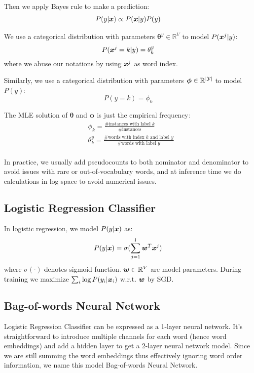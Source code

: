 \documentclass[11pt]{article}
\begin{document}
Then we apply Bayes rule to make a prediction:
\begin{equation*}
    P(y | \boldsymbol{x}) \propto P(\boldsymbol{x} | y) P(y)
\end{equation*}

We use a categorical distribution with parameters $\boldsymbol{\theta}^y\in \mathbb{R}^V$ to model $P(\boldsymbol{x}^j | y)$:
\begin{equation*}
    P(\boldsymbol{x}^j = k | y) = {\theta}^y_k
\end{equation*}
where we abuse our notations by using $\boldsymbol{x}^j$ as word index.

Similarly, we use a categorical distribution with parameters $\boldsymbol{\phi}\in \mathbb{R}^{|\mathcal{Y}|}$ to model $P(y)$:
\begin{equation*}
    P(y = k) = {\phi}_k
\end{equation*}

The MLE solution of $\boldsymbol{\theta}$ and $\boldsymbol{\phi}$ is just the empirical frequency:
\begin{align*}
    &\phi_k = \frac{\# \text{instances with label $k$}}{\# \text{instances}}\\
    &\theta^y_k = \frac{\# \text{words with index $k$ and label $y$}}{\# \text{words with label $y$}}\\
\end{align*}

In practice, we usually add pseudocounts to both nominator and denominator to avoid issues with rare or out-of-vocabulary words, and at inference time we do calculations in log space to avoid numerical issues.

\subsection{Logistic Regression Classifier}
In logistic regression, we model $P(y | \boldsymbol{x})$ as:
\begin{equation*}
    P(y|\boldsymbol{x}) = \sigma (\sum_{j=1}^l \boldsymbol{w}^T \boldsymbol{x}^j)
\end{equation*}
where $\sigma(\cdot)$ denotes sigmoid function. $\boldsymbol{w} \in \mathbb{R}^V$ are model parameters.
During training we maximize $\sum_{i}\log P(y_i | \boldsymbol{x}_i)$ w.r.t. $\boldsymbol{w}$ by SGD.

\subsection{Bag-of-words Neural Network}
Logistic Regression Classifier can be expressed as a 1-layer neural network. It's straightforward to introduce multiple channels for each word (hence word embeddings) and add a hidden layer to get a 2-layer neural network model.
Since we are still summing the word embeddings thus effectively ignoring word order information, we name this model Bag-of-words Neural Network.
\end{document}
